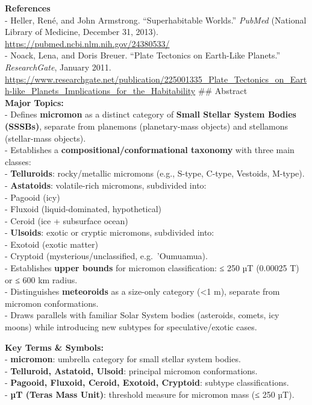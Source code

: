 \documentclass[
  letterpaper,
]{book}
\begin{document}
\textbf{References}\\
- Heller, René, and John Armstrong. ``Superhabitable Worlds.''
\emph{PubMed} (National Library of Medicine, December 31, 2013).
\url{https://pubmed.ncbi.nlm.nih.gov/24380533/}\\
- Noack, Lena, and Doris Breuer. ``Plate Tectonics on Earth-Like
Planets.'' \emph{ResearchGate}, January 2011.
\url{https://www.researchgate.net/publication/225001335_Plate_Tectonics_on_Earth-like_Planets_Implications_for_the_Habitability}
\#\# Abstract\\
\textbf{Major Topics:}\\
- Defines \textbf{micromon} as a distinct category of \textbf{Small
Stellar System Bodies (SSSBs)}, separate from planemons (planetary-mass
objects) and stellamons (stellar-mass objects).\\
- Establishes a \textbf{compositional/conformational taxonomy} with
three main classes:\\
- \textbf{Telluroids}: rocky/metallic micromons (e.g., S-type, C-type,
Vestoids, M-type).\\
- \textbf{Astatoids}: volatile-rich micromons, subdivided into:\\
- Pagooid (icy)\\
- Fluxoid (liquid-dominated, hypothetical)\\
- Ceroid (ice + subsurface ocean)\\
- \textbf{Ulsoids}: exotic or cryptic micromons, subdivided into:\\
- Exotoid (exotic matter)\\
- Cryptoid (mysterious/unclassified, e.g.~'Oumuamua).\\
- Establishes \textbf{upper bounds} for micromon classification: ≤ 250
µT (0.00025 T) or ≤ 600 km radius.\\
- Distinguishes \textbf{meteoroids} as a size-only category (\textless1
m), separate from micromon conformations.\\
- Draws parallels with familiar Solar System bodies (asteroids, comets,
icy moons) while introducing new subtypes for speculative/exotic cases.

\textbf{Key Terms \& Symbols:}\\
- \textbf{micromon}: umbrella category for small stellar system
bodies.\\
- \textbf{Telluroid, Astatoid, Ulsoid}: principal micromon
conformations.\\
- \textbf{Pagooid, Fluxoid, Ceroid, Exotoid, Cryptoid}: subtype
classifications.\\
- \textbf{µT (Teras Mass Unit)}: threshold measure for micromon mass (≤
250 µT).
\end{document}
